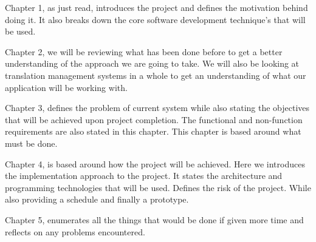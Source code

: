 Chapter 1, as just read, introduces the project and defines the motivation behind doing it. It also breaks down the core software development technique's that will be used. 

Chapter 2, we will be reviewing what has been done before to get a better understanding of the approach we are going to take. We will also be looking at translation management systems in a whole to get an understanding of what our application will be working with. 

Chapter 3, defines the problem of current system while also stating the objectives that will be achieved upon project completion. The functional and non-function requirements are also stated in this chapter. This chapter is based around what must be done.

Chapter 4, is based around how the project will be achieved. Here we introduces the implementation approach to the project. It states the architecture and programming technologies that will be used. Defines the risk of the project. While also providing a schedule and finally a prototype.

Chapter 5, enumerates all the things that would be done if given more time and reflects on any problems encountered. 